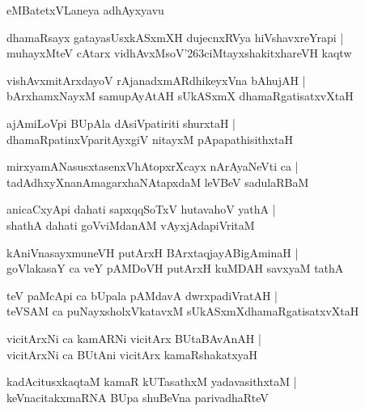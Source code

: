 \documentclass[twoside,12pt,openright]{book}
\def\S{\char'263}
\newcounter{shloka}[chapter]
\begin{document}
\begin{center}
eMBatetxVLaneya adhAyxyavu
\end{center}

\begin{shloka}%
dhamaRsayx gatayasUsxkASxmXH dujecnxRVya hiVshavxreYrapi |\\
muhayxMteV cAtarx vidhAvxMsoV\S ciMtayxshakitxhareVH kaqtw
\end{shloka}

\begin{shloka}%
vishAvxmitArxdayoV rAjanadxmARdhikeyxVna bAhujAH |\\
bArxhamxNayxM samupAyAtAH sUkASxmX dhamaRgatisatxvXtaH
\end{shloka}

\begin{shloka}%
ajAmiLoVpi BUpAla dAsiVpatiriti shurxtaH |\\
dhamaRpatinxVparitAyxgiV nitayxM pApapathisithxtaH 
\end{shloka}

\begin{shloka}%
mirxyamANasusxtasenxVhAtopxrXcayx nArAyaNeVti ca |\\
tadAdhxyXnanAmagarxhaNAtapxdaM leVBeV sadulaRBaM 
\end{shloka}

\begin{shloka}%
anicaCxyApi dahati sapxqqSoTxV hutavahoV yathA |\\
shathA dahati goVviMdanAM vAyxjAdapiVritaM 
\end{shloka}

\begin{shloka}%
kAniVnasayxmuneVH putArxH BArxtaqjayABigAminaH |\\
goVlakasaY ca veY pAMDoVH putArxH kuMDAH savxyaM tathA 
\end{shloka}

\begin{shloka}%
teV paMcApi ca bUpala pAMdavA dwrxpadiVratAH |\\
teVSAM ca puNayxsholxVkatavxM sUkASxmXdhamaRgatisatxvXtaH 
\end{shloka}

\begin{shloka}%
vicitArxNi ca kamARNi vicitArx BUtaBAvAnAH |\\
vicitArxNi ca BUtAni vicitArx kamaRshakatxyaH 
\end{shloka}

\begin{shloka}%
kadAcitusxkaqtaM kamaR kUTasathxM yadavasithxtaM |\\
keVnacitakxmaRNA BUpa shuBeVna parivadhaRteV 
\end{shloka}
\end{document}
